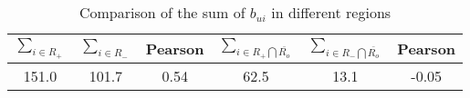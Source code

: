 \documentclass{vgtc}                          %
\begin{document}
\vspace{-4ex}
\begin{table}[htb]
\caption{Comparison of the sum of $b_{ui}$ in different regions}
\vspace{1ex}
\label{tablevalid}
\centering
\begin{tabular}{| c | c | c | | c | c | c |}
\hline
$\sum_{i \in R_+}$ & $\sum_{i \in R_-}$ & Pearson & $\sum_{i \in R_+ \bigcap \overline{R_o}}$ & $\sum_{i \in R_- \bigcap \overline{R_o}}$ & Pearson \\
\hline
151.0 & 101.7 & 0.54 & 62.5 & 13.1 & -0.05\\
\hline
\end{tabular}
\end{table}
\vspace{-2ex}



\end{document}
